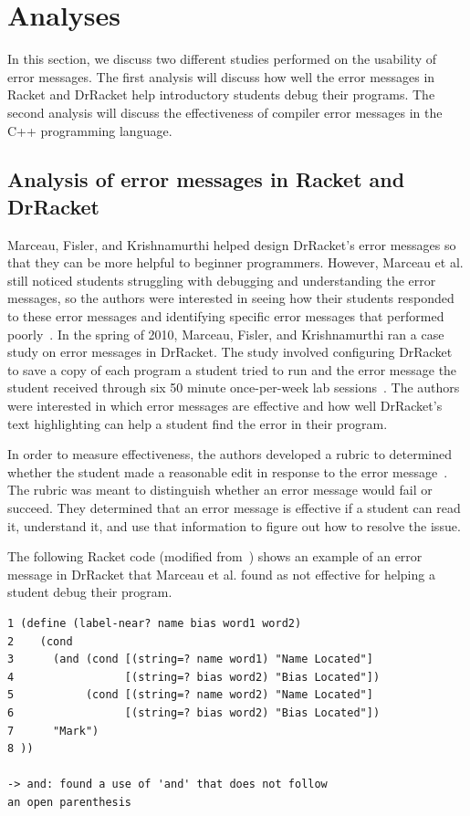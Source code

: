 \documentclass{sig-alternate}
\begin{document}
\section{Analyses}\label{sec:analyses}
In this section, we discuss two different studies performed on the usability of error messages.
The first analysis will discuss how well the error messages in Racket and DrRacket help introductory students debug their programs.
The second analysis will discuss the effectiveness of compiler error messages in the C++ programming language. 


\subsection{Analysis of error messages in Racket and DrRacket}\label{subsec:racket analysis}

Marceau, Fisler, and Krishnamurthi helped design DrRacket's error messages so that they can be more helpful to beginner programmers.
However, Marceau et al. still noticed students struggling with debugging and understanding the error messages, so the authors were interested in seeing how their students responded to these error messages and identifying specific error messages that performed poorly~\cite{Marceau:2011:MYL:2048237.2048241}.
In the spring of 2010, Marceau, Fisler, and Krishnamurthi ran a case study on error messages in DrRacket.
The study involved configuring DrRacket to save a copy of each program a student tried to run and the error message the student received through six 50 minute once-per-week lab sessions~\cite{Marceau:2011:MEE:1953163.1953308}.
The authors were interested in which error messages are effective and how well DrRacket's text highlighting can help a student find the error in their program.

In order to measure effectiveness, the authors developed a rubric to determined whether the student made a reasonable edit in response to the error message~\cite{Marceau:2011:MEE:1953163.1953308}.
The rubric was meant to distinguish whether an error message would fail or succeed.
They determined that an error message is effective if a student can read it, understand it, and use that information to figure out how to resolve the issue.

The following Racket code (modified from~\cite{Marceau:2011:MEE:1953163.1953308}) shows an example of an error message in DrRacket that Marceau et al. found as not effective for helping a student debug their program.

\begin{verbatim}
1 (define (label-near? name bias word1 word2)
2    (cond
3      (and (cond [(string=? name word1) "Name Located"]
4                 [(string=? bias word2) "Bias Located"])
5           (cond [(string=? name word2) "Name Located"]
6                 [(string=? bias word2) "Bias Located"])
7      "Mark")
8 ))

-> and: found a use of 'and' that does not follow 
an open parenthesis
\end{verbatim}
\end{document}
